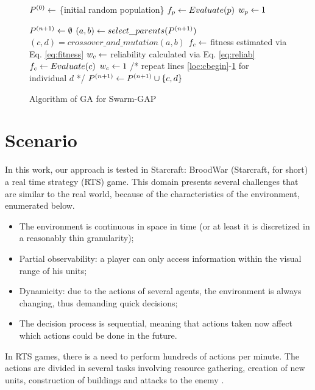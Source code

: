 \documentclass[a4paper]{sbgames}
\begin{document}
\begin{figure}[ht]
\begin{algorithmic}[1]
\STATE $P^{(0)} \gets$ \{initial random population\}
\STATE $f_{p} \gets Evaluate(p)$
\STATE $w_{p} \gets 1$
\ENDFOR

\STATE $P^{(n+1)} \gets \emptyset$
\STATE $(a,b) \gets select\_parents(P^{(n+1)})$
\STATE $(c,d) = crossover\_and\_mutation(a,b)$
\STATE $f_{c} \gets $ fitness estimated via Eq. \ref{eq:fitness} \label{loc:cbegin}
\STATE $w_{c} \gets $ reliability calculated via Eq. \ref{eq:reliab}
\STATE $f_{c} \gets Evaluate(c)$
\STATE $w_{c} \gets 1$ \label{loc:cend}
\ENDIF
\STATE /* repeat lines \ref{loc:cbegin}-\ref{loc:cend} for individual $d$ */
\STATE $P^{(n+1)} \gets P^{(n+1)} \cup \{c,d\}$
\ENDWHILE
\ENDFOR
\end{algorithmic}
\caption{Algorithm of GA for Swarm-GAP}
\end{figure}

\section{Scenario}
\label{sec:scenario}

In this work, our approach is tested in Starcraft: BroodWar (Starcraft, for short) a real time strategy (RTS) game. This domain presents several challenges that are similar to the real world, because of the characteristics of the environment, enumerated below.

\begin{itemize}
	\item The environment is continuous in space in time (or at least it is discretized in a reasonably thin granularity);
	\item Partial observability: a player can only access information within the visual range of his units;
	\item Dynamicity: due to the actions of several agents, the environment is always changing, thus demanding quick decisions;
	\item The decision process is sequential, meaning that actions taken now affect which actions could be done in the future.
\end{itemize}

In RTS games, there is a need to perform hundreds of actions per minute. The actions are divided in several tasks involving resource gathering, creation of new units, construction of buildings and attacks to the enemy \cite{Weber+2011}.
\end{document}

